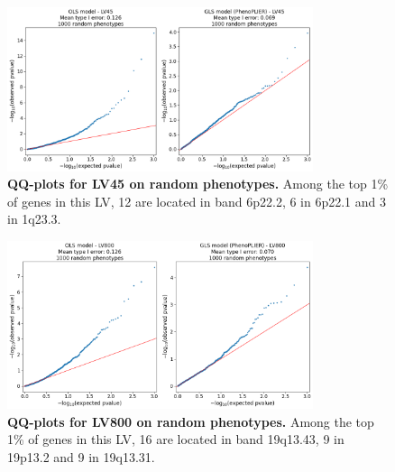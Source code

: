\documentclass[
  a4paper,
]{article}
\newenvironment{fignos:tagged-figure}[1][]{
  \let\oldfigurename\figurename
  \renewcommand{\figurename}{Supplementary Figure}
}{
  \let\figurename\oldfigurename
}
\begin{document}
\begin{fignos:tagged-figure}[S4]

\begin{figure}
\hypertarget{fig:reg:nulls:qqplot:lv45}{%
\centering
\includegraphics[width=0.8\textwidth,height=\textheight]{images/gls/null_sims/models_lv45.png}
\caption{\textbf{QQ-plots for LV45 on random phenotypes.}
Among the top 1\% of genes in this LV, 12 are located in band 6p22.2, 6 in 6p22.1 and 3 in 1q23.3.}\label{fig:reg:nulls:qqplot:lv45}
}
\end{figure}

\end{fignos:tagged-figure}

\begin{fignos:tagged-figure}[S5]

\begin{figure}
\hypertarget{fig:reg:nulls:qqplot:lv800}{%
\centering
\includegraphics[width=0.8\textwidth,height=\textheight]{images/gls/null_sims/models_lv800.png}
\caption{\textbf{QQ-plots for LV800 on random phenotypes.}
Among the top 1\% of genes in this LV, 16 are located in band 19q13.43, 9 in 19p13.2 and 9 in 19q13.31.}\label{fig:reg:nulls:qqplot:lv800}
}
\end{figure}

\end{fignos:tagged-figure}
\end{document}
